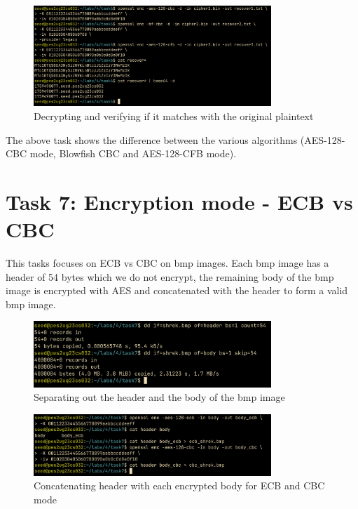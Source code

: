 \documentclass[12pt,a4paper]{article}
\begin{document}
\begin{figure}[H]
    \centering
    \includegraphics[width=0.8\textwidth]{./images/task6-3.png} 
    \caption{Decrypting and verifying if it matches with the original plaintext}
\end{figure}

The above task shows the difference between the various algorithms (AES-128-CBC mode, Blowfish CBC and AES-128-CFB mode).

\pagebreak

\section{Task 7: Encryption mode - ECB vs CBC}

This tasks focuses on ECB vs CBC on bmp images. Each bmp image has a header of 54 bytes which we do not encrypt, the remaining body of the bmp image is encrypted with AES and concatenated with the header to form a valid bmp image.

\begin{figure}[H]
    \centering
    \includegraphics[width=0.8\textwidth]{./images/task7-1.png} 
    \caption{Separating out the header and the body of the bmp image}
\end{figure}

\begin{figure}[H]
    \centering
    \includegraphics[width=0.8\textwidth]{./images/task7-2.png} 
    \caption{Concatenating header with each encrypted body for ECB and CBC mode}
\end{figure}
\end{document}
